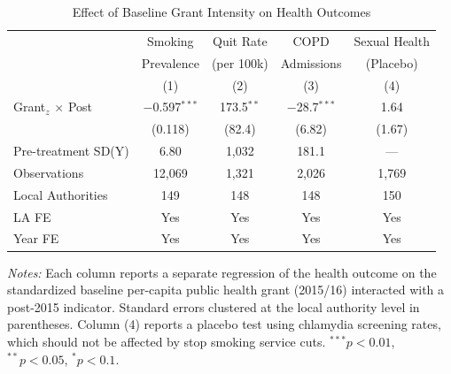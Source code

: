 \begin{table}[t]
\centering
\caption{Effect of Baseline Grant Intensity on Health Outcomes}
\label{tab:main}
\begin{tabular}{lcccc}
\hline\hline
 & Smoking & Quit Rate & COPD & Sexual Health \\
 & Prevalence & (per 100k) & Admissions & (Placebo) \\
 & (1) & (2) & (3) & (4) \\
\hline
Grant$_z$ $\times$ Post & $-$0.597$^{***}$ & 173.5$^{**}$ & $-$28.7$^{***}$ & 1.64 \\
 & (0.118) & (82.4) & (6.82) & (1.67) \\
\hline
Pre-treatment SD(Y) & 6.80 & 1,032 & 181.1 & --- \\
Observations & 12,069 & 1,321 & 2,026 & 1,769 \\
Local Authorities & 149 & 148 & 148 & 150 \\
LA FE & Yes & Yes & Yes & Yes \\
Year FE & Yes & Yes & Yes & Yes \\
\hline\hline
\end{tabular}
\begin{tablenotes}
\item \textit{Notes:} Each column reports a separate regression of the health outcome on the standardized baseline per-capita public health grant (2015/16) interacted with a post-2015 indicator. Standard errors clustered at the local authority level in parentheses. Column (4) reports a placebo test using chlamydia screening rates, which should not be affected by stop smoking service cuts. $^{***}p<0.01$, $^{**}p<0.05$, $^{*}p<0.1$.
\end{tablenotes}
\end{table}
